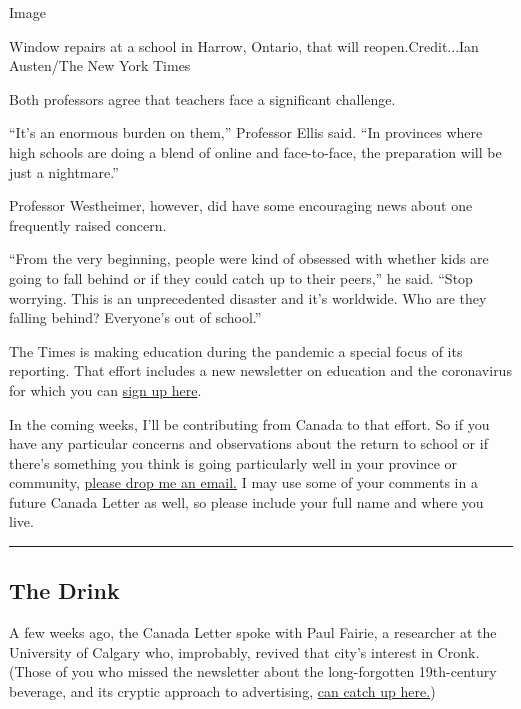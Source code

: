 Image

Window repairs at a school in Harrow, Ontario, that will
reopen.Credit...Ian Austen/The New York Times

Both professors agree that teachers face a significant challenge.

``It's an enormous burden on them,'' Professor Ellis said. ``In
provinces where high schools are doing a blend of online and
face-to-face, the preparation will be just a nightmare.''

Professor Westheimer, however, did have some encouraging news about one
frequently raised concern.

``From the very beginning, people were kind of obsessed with whether
kids are going to fall behind or if they could catch up to their
peers,'' he said. ``Stop worrying. This is an unprecedented disaster and
it's worldwide. Who are they falling behind? Everyone's out of school.''

The Times is making education during the pandemic a special focus of its
reporting. That effort includes a new newsletter on education and the
coronavirus for which you can
\href{https://www.nytimes3xbfgragh.onion/newsletters/coronavirus-briefing}{sign
up here}.

In the coming weeks, I'll be contributing from Canada to that effort. So
if you have any particular concerns and observations about the return to
school or if there's something you think is going particularly well in
your province or community, \href{mailto:austen@NYTimes.com}{please drop
me an email.} I may use some of your comments in a future Canada Letter
as well, so please include your full name and where you live.

\begin{center}\rule{0.5\linewidth}{\linethickness}\end{center}

\hypertarget{the-drink}{%
\subsection{The Drink}\label{the-drink}}

A few weeks ago, the Canada Letter spoke with Paul Fairie, a researcher
at the University of Calgary who, improbably, revived that city's
interest in Cronk. (Those of you who missed the newsletter about the
long-forgotten 19th-century beverage, and its cryptic approach to
advertising,
\href{https://www.nytimes3xbfgragh.onion/2020/07/24/world/canada/cronk.html}{can
catch up here.})


